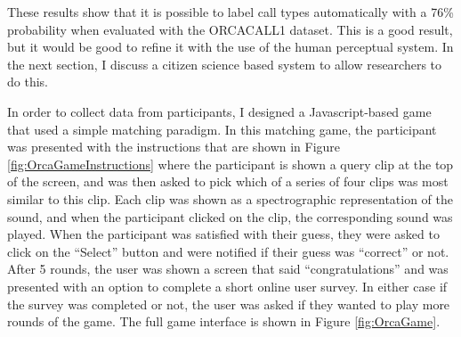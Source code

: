 These results show that it is possible to label call types automatically
with a 76\% probability when evaluated with the ORCACALL1 dataset.
This is a good result, but it would be good to refine it with the use
of the human perceptual system.  In the next section, I discuss a
citizen science based system to allow researchers to do this.


\label{chap:citizenscienceevaluation}

In order to collect data from participants, I designed a
Javascript-based game that used a simple matching paradigm. In this
matching game, the participant was presented with the instructions
that are shown in Figure \ref{fig:OrcaGameInstructions} where the
participant is shown a query clip at the top of the screen, and was
then asked to pick which of a series of four clips was most similar to
this clip.  Each clip was shown as a spectrographic representation of
the sound, and when the participant clicked on the clip, the
corresponding sound was played.  When the participant was satisfied
with their guess, they were asked to click on the ``Select'' button
and were notified if their guess was ``correct'' or not.  After 5
rounds, the user was shown a screen that said ``congratulations'' and
was presented with an option to complete a short online user survey.
In either case if the survey was completed or not, the user was asked
if they wanted to play more rounds of the game.  The full game
interface is shown in Figure \ref{fig:OrcaGame}.

